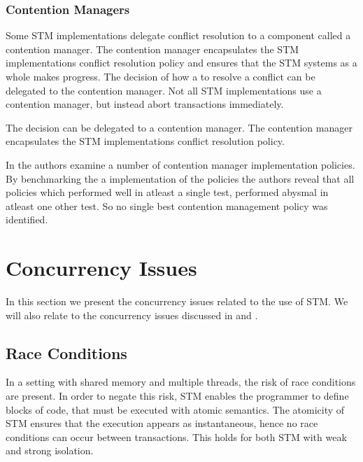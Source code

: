 \subsubsection{Contention Managers}
Some \ac{STM} implementations delegate conflict resolution to a component called a contention manager\cite[p. 2085]{herlihy2011tm}. The contention manager encapsulates the \ac{STM} implementations conflict resolution policy\cite[p. 2085]{herlihy2011tm} and ensures that the \ac{STM} systems as a whole makes progress\cite[p. 1]{guerraoui2005toward}. The decision of how a to resolve a conflict can be delegated to the contention manager. Not all \ac{STM} implementations use a contention manager, but instead abort transactions immediately\cite[38]{riegel2013software}.

The decision can be delegated to a contention manager. The contention manager encapsulates the \ac{STM} implementations conflict resolution policy\cite[p. 2085]{herlihy2011tm}.

In \cite{scherer2004contention} the authors examine a number of contention manager implementation policies. By benchmarking the a implementation of the policies the authors reveal that all policies which performed well in atleast a single test, performed abysmal in atleast one other test. So no single best contention management policy was identified.


\section{Concurrency Issues}
In this section we present the concurrency issues related to the use of \ac{STM}. We will also relate to the concurrency issues discussed in  and .
\label{sec:stm_issues}

\subsection{Race Conditions}
In a setting with shared memory and multiple threads, the risk of race conditions are present. In order to negate this risk, \ac{STM} enables the programmer to define blocks of code, that must be executed with atomic semantics. The atomicity of \ac{STM} ensures that the execution appears as instantaneous, hence no race conditions can occur between transactions. This holds for both \ac{STM} with weak and strong isolation.

